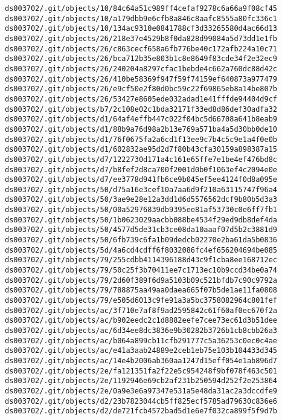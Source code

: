 \documentclass[11pt]{article}
\begin{document}
\begin{Verbatim}[commandchars=\\\{\}]
ds003702/.git/objects/10/84c64a51c989ff4cefaf9278c6a66a9f08cf45
ds003702/.git/objects/10/a179dbb9e6cfb8a846c8aafc8555a80fc336c1
ds003702/.git/objects/10/134ac9310e0841788cf3d33265580d4ac66d13
ds003702/.git/objects/26/218e37e4529b8f0da828d99084a5d73dd1e1fb
ds003702/.git/objects/26/c863cecf658a6fb776be40c172afb224a10c71
ds003702/.git/objects/26/bca712b35e803b1c8e8649f83cde34f2e32ec9
ds003702/.git/objects/26/240204a8297cfac1bebde4c662a760dc88d42c
ds003702/.git/objects/26/410be58369f947f59f74159ef640873a977479
ds003702/.git/objects/26/e9cf50e2f80d0bc59c22f69865eb8a14be807b
ds003702/.git/objects/26/53427e8605ede032adad1e41fffde94404d9cf
ds003702/.git/objects/b7/2c108e02c1bda32171f33ed8d86def30adfa32
ds003702/.git/objects/d1/64af4effb447c022f04bc5d66708a641b8eab9
ds003702/.git/objects/d1/88b9a76d98a2b13e769a571ba4a5d30bb0de10
ds003702/.git/objects/d1/76f0675fa2a6cd1f13ee9c7b4c5c9e1a4f0e0b
ds003702/.git/objects/d1/602832ae95d2d7f80b43cfa30159a898387a15
ds003702/.git/objects/d7/1222730d171a4c161e65ffe7e1be4ef476bd8c
ds003702/.git/objects/d7/b8fef2d8ca700f2001d0b0f1063ef4c2094e0e
ds003702/.git/objects/d7/ee3778d941fb6ce9b045ef5ee4124f0d8a095e
ds003702/.git/objects/50/d75a16e3cef10a7aa6d9f210a63115747f96a4
ds003702/.git/objects/50/3ae9e28e12a3dd1d6d5576562dcf9b80b5d3a3
ds003702/.git/objects/50/00a52976839db9395ee81af53730c0e6ff7fb1
ds003702/.git/objects/50/1b0623029aacbb088be4534f29ed9db8def4da
ds003702/.git/objects/50/4577d5de31cb3ce08da10aaaf07d5b2c3881d9
ds003702/.git/objects/50/6fb739c6fa1b09dedcb02270e2ba61da5b0836
ds003702/.git/objects/5d/4a6cd4cdff6f8032086fc4ef656204694be085
ds003702/.git/objects/79/255cdbb4114396188d43c9f1cba8ee168712ec
ds003702/.git/objects/79/50c25f3b70411ee7c1713ec10b9ccd34be0a74
ds003702/.git/objects/79/2d60f389f6d9a5103b09c521bfdb7c90c9792a
ds003702/.git/objects/79/788875aa49aa0daea665f07b5de1ae11fa0808
ds003702/.git/objects/79/e505d6013c9fe91a3a5bc3758082964c801fef
ds003702/.git/objects/ac/3f710e7af8f9ad2595842c61f60af0ec670f2a
ds003702/.git/objects/ac/b902eedc2c1d8882eefe7cee73ec61d3b51dee
ds003702/.git/objects/ac/6d34ee8dc3836e9b30282b3726b1cb8cbb26a3
ds003702/.git/objects/ac/b064a899cb11cfb291777c5a36253c0ec0c4ae
ds003702/.git/objects/ac/e41a3aab24889e2ceb1eb75e103b104433d345
ds003702/.git/objects/ac/14e4b2006ab360aa1247d15eff054e1ab896d7
ds003702/.git/objects/2e/fa121351fa2f22e5c954248f9bf078f463c501
ds003702/.git/objects/2e/1192946e69cb2af231b250594d252f2e253864
ds003702/.git/objects/2e/0a9e3e6a97347e531a5e48da31ac2a3dccdfe9
ds003702/.git/objects/d2/23b7823044cb5ff825ecf5785ad79630c836e6
ds003702/.git/objects/d2/de721fcb4572bad5d1e6e7f032ca899f5f9d7b

\end{Verbatim}
\end{document}
